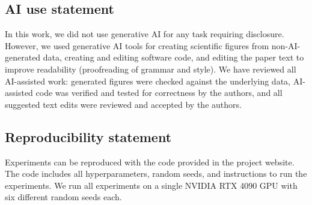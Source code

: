 \documentclass{article} %
\begin{document}







\subsection*{AI use statement}
In this work, we did not use generative AI for any task requiring disclosure.
However, we used generative AI tools
for creating scientific figures from non-AI-generated data, creating and
editing software code, and editing the paper text to improve readability
(proofreading of grammar and style). We have reviewed all AI-assisted work:
generated figures were checked against the underlying data, AI-assisted code
was verified and tested for correctness by the authors, and all suggested text
edits were reviewed and accepted by the authors.

\subsection*{Reproducibility statement}
Experiments can be reproduced with the code provided in the project website. The code includes all hyperparameters, random seeds, and instructions to run the experiments. We run all experiments on a single NVIDIA RTX 4090 GPU with six different random seeds each.






\appendix

\end{document}
